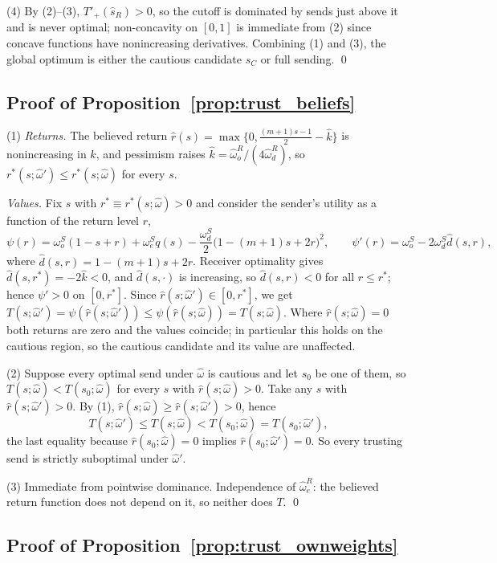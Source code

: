 \documentclass[11pt]{article}
\theoremstyle{plain}
\theoremstyle{remark}
\begin{document}
(4) By (2)--(3), $T'_+(\hat s_R)>0$, so the cutoff is dominated by sends just above it and is never optimal; non-concavity on $[0,1]$ is immediate from (2) since concave functions have nonincreasing derivatives.  Combining (1) and (3), the global optimum is either the cautious candidate $s_C$ or full sending.
\qed

\subsection*{Proof of Proposition~\ref{prop:trust_beliefs}}

(1) \emph{Returns.}  The believed return $\hat r(s)=\max\{0,\tfrac{(m+1)s-1}2-\hat k\}$ is nonincreasing in $\hat k$, and pessimism raises $\hat k=\hat\omega_o^{R}/(4\hat\omega_d^{R})$, so $r^\ast(s;\hat\omega')\le r^\ast(s;\hat\omega)$ for every $s$.

\emph{Values.}  Fix $s$ with $r^\ast\equiv r^\ast(s;\hat\omega)>0$ and consider the sender's utility as a function of the return level $r$,
\[
        \psi(r)=\omega_o^S(1-s+r)+\omega_e^S q(s)-\frac{\omega_d^S}{2}\big(1-(m+1)s+2r\big)^2,
        \qquad
        \psi'(r)=\omega_o^S-2\omega_d^S\hat d(s,r),
\]
where $\hat d(s,r)=1-(m+1)s+2r$.  Receiver optimality gives $\hat d(s,r^\ast)=-2\hat k<0$, and $\hat d(s,\cdot)$ is increasing, so $\hat d(s,r)<0$ for all $r\le r^\ast$; hence $\psi'>0$ on $[0,r^\ast]$.  Since $\hat r(s;\hat\omega')\in[0,r^\ast]$, we get $T(s;\hat\omega')=\psi(\hat r(s;\hat\omega'))\le\psi(\hat r(s;\hat\omega))=T(s;\hat\omega)$.  Where $\hat r(s;\hat\omega)=0$ both returns are zero and the values coincide; in particular this holds on the cautious region, so the cautious candidate and its value are unaffected.

(2) Suppose every optimal send under $\hat\omega$ is cautious and let $s_0$ be one of them, so $T(s;\hat\omega)<T(s_0;\hat\omega)$ for every $s$ with $\hat r(s;\hat\omega)>0$.  Take any $s$ with $\hat r(s;\hat\omega')>0$.  By (1), $\hat r(s;\hat\omega)\ge\hat r(s;\hat\omega')>0$, hence
\[
        T(s;\hat\omega')\le T(s;\hat\omega)<T(s_0;\hat\omega)=T(s_0;\hat\omega'),
\]
the last equality because $\hat r(s_0;\hat\omega)=0$ implies $\hat r(s_0;\hat\omega')=0$.  So every trusting send is strictly suboptimal under $\hat\omega'$.

(3) Immediate from pointwise dominance.  Independence of $\hat\omega_e^{R}$: the believed return function does not depend on it, so neither does $T$.
\qed

\subsection*{Proof of Proposition~\ref{prop:trust_ownweights}}
\end{document}
